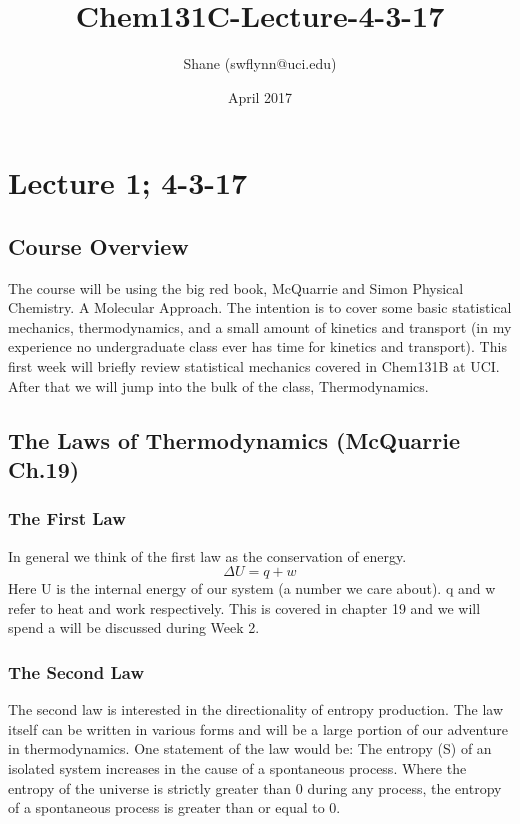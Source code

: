\documentclass{article}
\title{Chem131C-Lecture-4-3-17}
\author{Shane (swflynn@uci.edu) }
\date{April 2017}
\begin{document}
\maketitle

\section{Lecture 1; 4-3-17}
\subsection*{Course Overview}
The course will be using the big red book, McQuarrie and Simon Physical Chemistry. A Molecular Approach. 
The intention is to cover some basic statistical mechanics, thermodynamics, and a small amount of kinetics and transport (in my experience no undergraduate class ever has time for kinetics and transport). 
This first week will briefly review statistical mechanics covered in Chem131B at UCI. 
After that we will jump into the bulk of the class, Thermodynamics. 

\subsection*{The Laws of Thermodynamics (McQuarrie Ch.19)}

\subsubsection*{The First Law}
In general we think of the first law as the conservation of energy.
\begin{equation}
    \Delta U = q + w
\end{equation}
Here U is the internal energy of our system (a number we care about).
q and w refer to heat and work respectively. 
This is covered in chapter 19 and we will spend a will be discussed during Week 2. 

\subsubsection*{The Second Law}
The second law is interested in the directionality of entropy production.
The law itself can be written in various forms and will be a large portion of our adventure in thermodynamics. 
One statement of the law would be: The entropy (S) of an isolated system increases in the cause of a spontaneous process. 
Where the entropy of the universe is strictly greater than 0 during any process, the entropy of a spontaneous process is greater than or equal to 0. 
\end{document}
